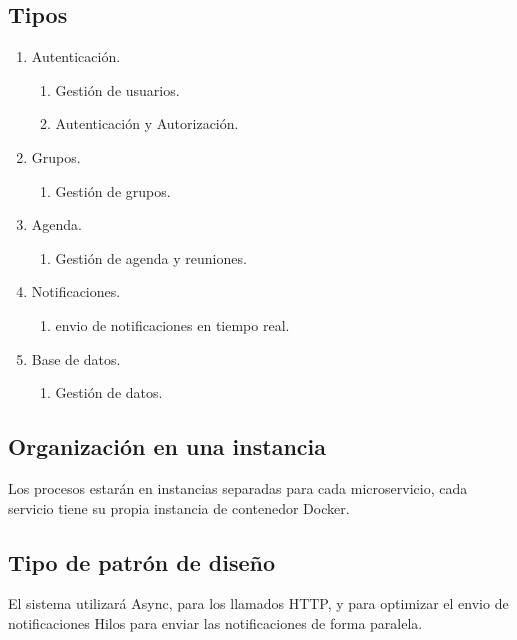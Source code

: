 \documentclass[11pt,a4paper]{article}
\begin{document}
\subsection{Tipos}
    \begin{enumerate}
        \item Autenticaci\'on.
        \begin{enumerate}
            \item Gesti\'on de usuarios.
            \item Autenticaci\'on y Autorizaci\'on.
        \end{enumerate} 
        \item Grupos.
        \begin{enumerate}
            \item Gesti\'on de grupos.
        \end{enumerate} 
        \item Agenda.
        \begin{enumerate}
            \item Gesti\'on de agenda y reuniones.
        \end{enumerate} 
        \item Notificaciones.
        \begin{enumerate}
            \item envio de notificaciones en tiempo real.
        \end{enumerate} 
        \item Base de datos.
        \begin{enumerate}
            \item Gesti\'on de datos.
        \end{enumerate} 
    \end{enumerate}
\subsection{Organizaci\'on en una instancia}

Los procesos estar\'an en instancias separadas para cada microservicio, cada servicio tiene su propia instancia de contenedor Docker.

\subsection{Tipo de patr\'on de diseño}

El sistema utilizar\'a Async, para los llamados HTTP, y para optimizar el envio de notificaciones Hilos para enviar las notificaciones de forma paralela.
\end{document}
